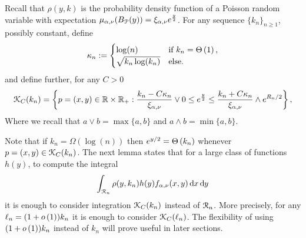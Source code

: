 Recall that $\rho(y, k)$ is the probability density function of a Poisson random variable with expectation $\mu_{\alpha, \nu}(B_{{\mathcal P}}(y)) = \xi_{\alpha,\nu}e^{\frac{y}{2}}$. 
For any sequence $\{k_n\}_{n \ge 1}$, possibly constant, define
\begin{equation}\label{eq:def_kappa_n}
	\kappa_n := \begin{cases}
		\log(n) &\mbox{if } k_n = \Theta\left(1\right),\\
		\sqrt{k_n \log(k_n)} &\mbox{else.}
	\end{cases}
\end{equation}
and define further, for any $C > 0$
\begin{equation}\label{eq:def_K_C_set}
	{\mathcal K}_C(k_n) = \left\{p=(x,y) \in {\ensuremath{\mathbb R}} \times {\ensuremath{\mathbb R}}_+ : \frac{k_n - C \kappa_n}{\xi_{\alpha,\nu}} \vee 0 \le e^{\frac{y}{2}}
	\le \frac{k_n + C \kappa_n}{\xi_{\alpha,\nu}} \wedge e^{R_n/2} \right\},
\end{equation}
Where we recall that $a \vee b = \max\{a,b\}$ and $a \wedge b = \min\{a,b\}$.

Note that if $k_n = \Omega(\log(n))$ then $e^{y/2} = \Theta\left(k_n\right)$ whenever $p=(x,y) \in {\mathcal K}_C(k_n)$. The next lemma states that for a large class of functions $h(y)$, to compute the integral 
\[
	\int_{{\mathcal R}_n} \rho(y,k_n) h(y) f_{\alpha,\nu}(x,y) \operatorname{\mathrm{d}\hspace{-2pt}} x \operatorname{\mathrm{d}\hspace{-2pt}} y
\]
it is enough to consider integration  ${\mathcal K}_C(k_n)$ instead of ${\mathcal R}_n$. More precisely, for any $\ell_n = (1 + o\left(1\right))k_n$ it is enough to consider ${\mathcal K}_C(\ell_n)$. The flexibility of using $(1+o\left(1\right))k_n$ instead of $k_n$ will prove useful in later sections.

